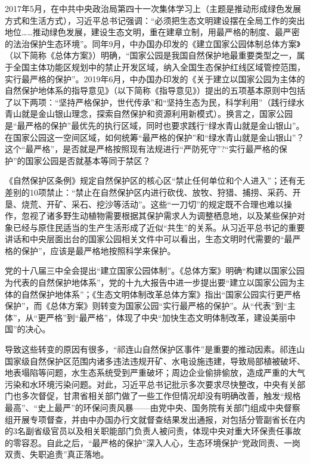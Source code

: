 \documentclass[
]{book}
\begin{document}
2017年5月，在中共中央政治局第四十一次集体学习上（主题是推动形成绿色发展方式和生活方式），习近平总书记强调：``必须把生态文明建设摆在全局工作的突出地位\ldots\ldots 推动绿色发展，建设生态文明，重在建章立制，用最严格的制度、最严密的法治保护生态环境''。同年9月，中办国办印发的《建立国家公园体制总体方案》（以下简称《总体方案》）明确，``国家公园是我国自然保护地最重要类型之一，属于全国主体功能区规划中的禁止开发区域，纳入全国生态保护红线区域管控范围，实行最严格的保护''。2019年6月，中办国办印发的《关于建立以国家公园为主体的自然保护地体系的指导意见》（以下简称《指导意见》）提出的五项基本原则中包括了以下两项：``坚持严格保护，世代传承''和``坚持生态为民，科学利用''（践行绿水青山就是金山银山理念，探索自然保护和资源利用新模式）。换言之，国家公园是``最严格的保护''最优先的执行区域，同时也要求践行``绿水青山就是金山银山''。在国家公园这一空间区域，如何统筹``最严格的保护''和``绿水青山就是金山银山''？这个``最严格''，是否就是严格按照现有法规进行``严防死守''?``实行最严格的保护''的国家公园是否就基本等同于禁区？

《自然保护区条例》规定自然保护区的核心区``禁止任何单位和个人进入''；还有无差别的10项禁止：``禁止在自然保护区内进行砍伐、放牧、狩猎、捕捞、采药、开垦、烧荒、开矿、采石、挖沙等活动''。这些``一刀切''的规定既不合理也难以操作，忽视了诸多野生动植物需要根据其保护需求人为调整栖息地，以及某些保护对象已经与原住民适当的生产生活形成了近似``共生''的关系。从习近平总书记的重要讲话和中央层面出台的国家公园相关文件中可以看出，生态文明时代需要的``最严格的保护''，应该是最严格地按照科学来保护。

党的十八届三中全会提出``建立国家公园体制''。《总体方案》明确``构建以国家公园为代表的自然保护地体系''，党的十九大报告中进一步提出要``建立以国家公园为主体的自然保护地体系''；《生态文明体制改革总体方案》指出``国家公园实行更严格保护''，而《总体方案》则转变为国家公园``实行最严格的保护''。从``代表''到``主体''，从``更严格''到``最严格''，体现了中央``加快生态文明体制改革，建设美丽中国''的决心。

导致这些转变的原因有很多，``祁连山自然保护区事件''是重要的推动因素。祁连山国家级自然保护区范围内诸多违法违规开矿、水电设施违建，导致局部植被破坏、地表塌陷等问题，水生态系统受到严重破坏；周边企业偷排偷放，造成严重的大气污染和水环境污染问题。对此，习近平总书记批示多次要求尽快整改，中央有关部门也多次督促，甘肃省相关部门做了一些工作但情况却没有明确改善，触发``规格最高''、``史上最严''的环保问责风暴------由党中央、国务院有关部门组成中央督察组开展专项督查，并由中办国办行文就督查结果发出通报，对包括分管副省长在内的3名副省级官员以及相关职能部门负责人被问责，体现中央对重大环保责任事故的零容忍。自此之后，``最严格的保护''深入人心，生态环境保护``党政同责、一岗双责、失职追责''真正落地。
\end{document}
